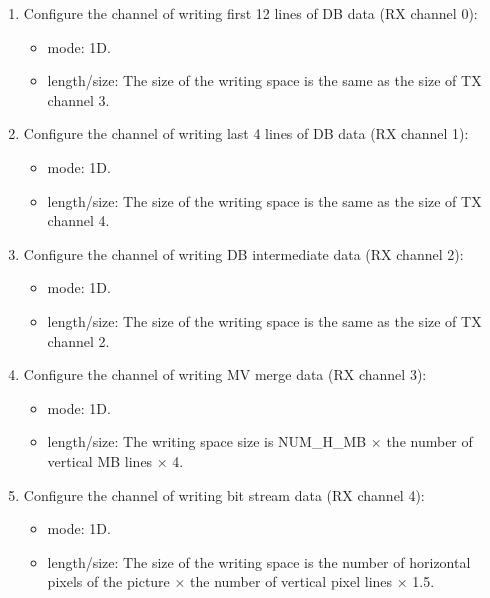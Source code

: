\documentclass[main\_\_EN.tex]{subfiles}
\begin{document}
\begin{enumerate}
\begin{itemize}
    \end{itemize}
    \item Configure the channel of writing first 12 lines of DB data (RX channel 0):
    \begin{itemize}
        \item mode: 1D.
        \item length/size: The size of the writing space is the same as the size of TX channel 3.
    \end{itemize}
    \item Configure the channel of writing last 4 lines of DB data (RX channel 1):
    \begin{itemize}
        \item mode: 1D.
        \item length/size: The size of the writing space is the same as the size of TX channel 4.
    \end{itemize}
    \item Configure the channel of writing DB intermediate data (RX channel 2):
    \begin{itemize}
        \item mode: 1D.
        \item length/size: The size of the writing space is the same as the size of TX channel 2.
    \end{itemize}
    \item Configure the channel of writing MV merge data (RX channel 3):
    \begin{itemize}
        \item mode: 1D.
        \item length/size: The writing space size is NUM\_H\_MB × the number of vertical MB lines × 4.
    \end{itemize}
    \item Configure the channel of writing bit stream data (RX channel 4):
    \begin{itemize}
        \item mode: 1D.
        \item length/size: The size of the writing space is the number of horizontal pixels of the picture × the number of vertical pixel lines × 1.5.
    \end{itemize}
\end{enumerate}
\end{document}
